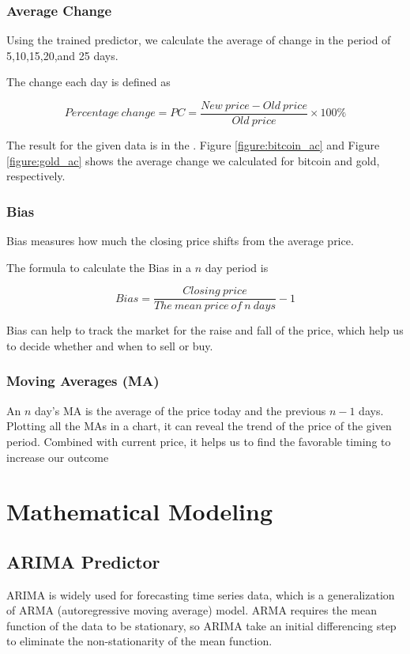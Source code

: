 \documentclass[12pt,a4paper]{article}
\newcommand{\Predictor}{ARIMA }
\begin{document}
\begin{spacing}{1.2}
\subsubsection{Average Change}

Using the trained predictor, we calculate the average of change in the period of 5,10,15,20,and 25 days.

The change each day is defined as

$$
Percentage \ change = PC = \frac{New \ price-Old \ price}{Old \ price} \times 100\%
$$


The result for the given data is in the . Figure \ref{figure:bitcoin_ac} and Figure \ref{figure:gold_ac} shows the average change we calculated for bitcoin and gold, respectively.


\subsubsection{Bias}

Bias measures how much the closing price shifts from the average price.

The formula to calculate the Bias in a $n$ day period is

$$
Bias = \frac{Closing \ price}{The \ mean \ price \ of \ n \ days} - 1
$$

Bias can help to track the market for the raise and fall of the price, which help us to decide whether and when to sell or buy.

\subsubsection{Moving Averages (MA)}

An $n$ day's MA is the average of the price today and the previous $n-1$ days. Plotting all the MAs in a chart, it can reveal the trend of the price of the given period. Combined with current price, it helps us to find the favorable timing to increase our outcome

\section{Mathematical Modeling}
\label{MathModels}

\subsection{\Predictor Predictor}

\Predictor is widely used for forecasting time series data, which is a generalization of ARMA (autoregressive moving average) model. ARMA requires the mean function of the data to be stationary, so ARIMA take an initial differencing step to eliminate the non-stationarity of the mean function.


\end{spacing}
\end{document}
